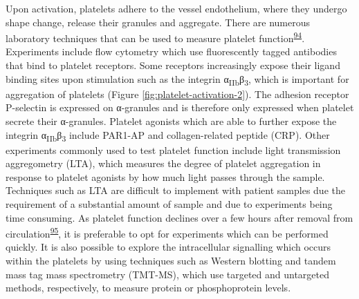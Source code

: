 \documentclass[11pt,twoside]{bristolthesis}
\begin{document}
Upon activation, platelets adhere to the vessel endothelium, where they undergo shape change, release their granules and aggregate. There are numerous laboratory techniques that can be used to measure platelet function\textsuperscript{\protect\hyperlink{ref-Paniccia2015}{94}}. Experiments include flow cytometry which use fluorescently tagged antibodies that bind to platelet receptors. Some receptors increasingly expose their ligand binding sites upon stimulation such as the integrin α\textsubscript{IIb}β\textsubscript{3}, which is important for aggregation of platelets (Figure \ref{fig:platelet-activation-2}). The adhesion receptor P-selectin is expressed on α-granules and is therefore only expressed when platelet secrete their α-granules. Platelet agonists which are able to further expose the integrin α\textsubscript{IIb}β\textsubscript{3} include PAR1-AP and collagen-related peptide (CRP). Other experiments commonly used to test platelet function include light transmission aggregometry (LTA), which measures the degree of platelet aggregation in response to platelet agonists by how much light passes through the sample. Techniques such as LTA are difficult to implement with patient samples due the requirement of a substantial amount of sample and due to experiments being time consuming. As platelet function declines over a few hours after removal from circulation\textsuperscript{\protect\hyperlink{ref-Goss2019}{95}}, it is preferable to opt for experiments which can be performed quickly. It is also possible to explore the intracellular signalling which occurs within the platelets by using techniques such as Western blotting and tandem mass tag mass spectrometry (TMT-MS), which use targeted and untargeted methods, respectively, to measure protein or phosphoprotein levels.
\end{document}
